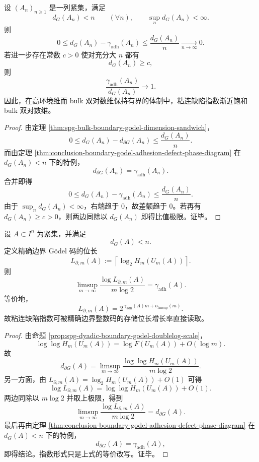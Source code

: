 \begin{theorem}[高环境维极限中的粘连饱和]\label{thm:conclusion-boundary-godel-highambient-adhesion-saturation}
设 \((A_n)_{n\ge 1}\) 是一列紧集，满足
\[
d_G(A_n)<n\qquad(\forall n),
\qquad
\sup_{n} d_G(A_n)<\infty.
\]
则
\[
0\le d_G(A_n)-\gamma_{\mathrm{adh}}(A_n)\le \frac{d_G(A_n)}{n}\xrightarrow[n\to\infty]{}0.
\]
若进一步存在常数 \(c>0\) 使对充分大 \(n\) 都有
\[
d_G(A_n)\ge c,
\]
则
\[
\frac{\gamma_{\mathrm{adh}}(A_n)}{d_G(A_n)}\longrightarrow 1.
\]
因此，在高环境维而 bulk 双对数维保持有界的体制中，粘连缺陷指数渐近饱和 bulk 双对数维。
\end{theorem}
\begin{proof}
由定理 \ref{thm:spg-bulk-boundary-godel-dimension-sandwich}，
\[
0\le d_G(A_n)-d_{\partial G}(A_n)\le \frac{d_G(A_n)}{n}.
\]
而由定理 \ref{thm:conclusion-boundary-godel-adhesion-defect-phase-diagram} 在 \(d_G(A_n)<n\) 下的特例，
\[
d_{\partial G}(A_n)=\gamma_{\mathrm{adh}}(A_n).
\]
合并即得
\[
0\le d_G(A_n)-\gamma_{\mathrm{adh}}(A_n)\le \frac{d_G(A_n)}{n}.
\]
由于 \(\sup_n d_G(A_n)<\infty\)，右端趋于 \(0\)，故差额趋于 \(0\)。若再有 \(d_G(A_n)\ge c>0\)，则两边同除以 \(d_G(A_n)\) 即得比值极限。证毕。
\end{proof}

\begin{theorem}\label{thm:conclusion-boundary-godel-bitlength-exponent-equals-adhesion}
设 \(A\subset I^n\) 为紧集，并满足
\[
d_G(A)<n.
\]
定义精确边界 Gödel 码的位长
\[
L_{\partial,m}(A):=\left\lceil \log_2 H_m(U_m(A))\right\rceil .
\]
则
\[
\limsup_{m\to\infty}\frac{\log L_{\partial,m}(A)}{m\log 2}
=
\gamma_{\mathrm{adh}}(A).
\]
等价地，
\[
L_{\partial,m}(A)=2^{\,\gamma_{\mathrm{adh}}(A)m+o_{\limsup}(m)}.
\]
故粘连缺陷指数可被精确边界整数码的存储位长增长率直接读取。
\end{theorem}
\begin{proof}
由命题 \ref{prop:spg-dyadic-boundary-godel-doublelog-scale}，
\[
\log\log H_m(U_m(A))=\log F(U_m(A))+O(\log m).
\]
故
\[
d_{\partial G}(A)=\limsup_{m\to\infty}\frac{\log\log H_m(U_m(A))}{m\log 2}.
\]
另一方面，由 \(L_{\partial,m}(A)=\log_2 H_m(U_m(A))+O(1)\) 可得
\[
\log L_{\partial,m}(A)=\log\log H_m(U_m(A))+O(1).
\]
两边同除以 \(m\log 2\) 并取上极限，得到
\[
\limsup_{m\to\infty}\frac{\log L_{\partial,m}(A)}{m\log 2}
=
d_{\partial G}(A).
\]
最后再由定理 \ref{thm:conclusion-boundary-godel-adhesion-defect-phase-diagram} 在 \(d_G(A)<n\) 下的特例，
\[
d_{\partial G}(A)=\gamma_{\mathrm{adh}}(A),
\]
即得结论。指数形式只是上式的等价改写。证毕。
\end{proof}

